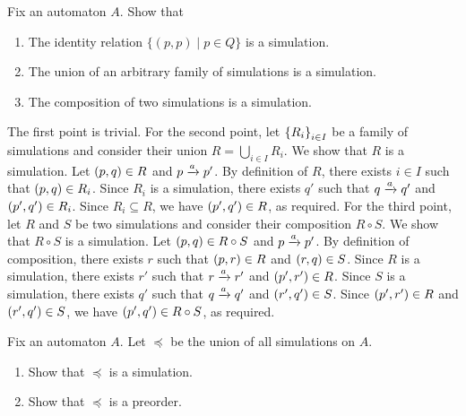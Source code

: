 \begin{exercise}
    Fix an automaton $A$.
    Show that
    \begin{enumerate}
        \item The identity relation $\{(p, p) \mid p \in Q\}$ is a simulation.
        \item The union of an arbitrary family of simulations is a simulation.
        \item The composition of two simulations is a simulation.
    \end{enumerate}
\end{exercise}
\begin{solution}
    The first point is trivial.
    For the second point, let $\left\{R_i\right\}_{i \in I}$ be a family of simulations
    and consider their union $R = \bigcup_{i \in I} R_i$.
    We show that $R$ is a simulation.
    Let $\left( p, q \right) \in R$ and $p \xrightarrow{a} p'$.
    By definition of $R$, there exists $i \in I$ such that $\left( p, q \right) \in R_i$.
    Since $R_i$ is a simulation, there exists $q'$ such that $q \xrightarrow{a} q'$ and $\left( p', q' \right) \in R_i$.
    Since $R_i \subseteq R$, we have $\left( p', q' \right) \in R$, as required.
    For the third point, let $R$ and $S$ be two simulations and consider their composition $R \circ S$.
    We show that $R \circ S$ is a simulation.
    Let $\left( p, q \right) \in R \circ S$ and $p \xrightarrow{a} p'$.
    By definition of composition, there exists $r$ such that $\left( p, r \right) \in R$ and $\left( r, q \right) \in S$.
    Since $R$ is a simulation, there exists $r'$ such that $r \xrightarrow{a} r'$ and $\left( p', r' \right) \in R$.
    Since $S$ is a simulation, there exists $q'$ such that $q \xrightarrow{a} q'$ and $\left( r', q' \right) \in S$.
    Since $\left( p', r' \right) \in R$ and $\left( r', q' \right) \in S$, we have $\left( p', q' \right) \in R \circ S$, as required.
\end{solution}

\begin{exercise}
    Fix an automaton $A$.
    Let $\preceq$ be the union of all simulations on $A$.
    \begin{enumerate}
        \item Show that $\preceq$ is a simulation.
        \item Show that $\preceq$ is a preorder.
    \end{enumerate}
\end{exercise}

\begin{solution}
\end{solution}

